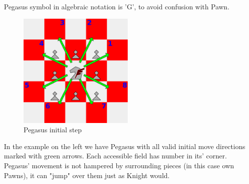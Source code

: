 \documentclass[a5paper,12pt,draft]{book} %
\begin{document}
Pegasus symbol in algebraic notation is 'G', to avoid confusion with Pawn.

\vspace{1\baselineskip}

\noindent
\begin{figure}
\includegraphics[width=0.5\textwidth, keepaspectratio=true]{../gfx/examples/01_move_pegasus_initial.png}
\caption{Pegasus initial step}
\label{fig:pegasus_initial_step}
\end{figure}
\indent
In the example on the left we have Pegasus with all valid initial move directions
marked with green arrows. Each accessible field has number in its' corner.
Pegasus' movement is not hampered by surrounding pieces (in this case own Pawns),
it can "jump" over them just as Knight would.

\clearpage
\end{document}
